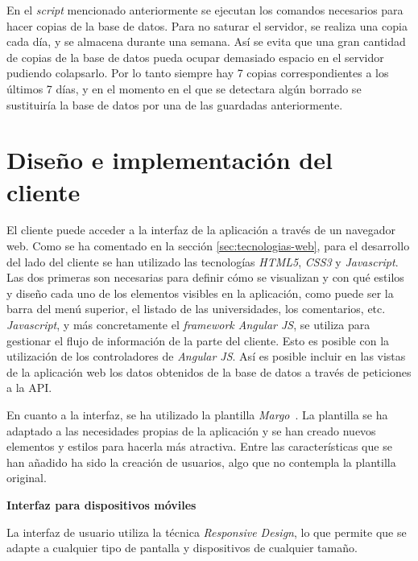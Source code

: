 \documentclass[a4paper, 12pt]{book}
\begin{document}
En el  \textit{script} mencionado anteriormente se ejecutan los comandos necesarios para hacer copias de la base de datos. Para no saturar el servidor, se realiza una copia cada día, y se almacena durante una semana. Así se evita que una gran cantidad de copias de la base de datos pueda ocupar demasiado espacio en el servidor pudiendo colapsarlo. Por lo tanto siempre hay 7 copias correspondientes a los últimos 7 días, y en el momento en el que se detectara algún borrado se sustituiría la base de datos por una de las guardadas anteriormente.



\section{Diseño e implementación del cliente} 
\label{sec:diseno-cliente}

El cliente puede acceder a la interfaz de la aplicación a través de un navegador web. Como se ha comentado en la sección \ref{sec:tecnologias-web}, para el desarrollo del lado del cliente se han utilizado las tecnologías  \textit{HTML5},  \textit{CSS3} y  \textit{Javascript}. Las dos primeras son necesarias para definir cómo se visualizan y con qué estilos y diseño cada uno de los elementos visibles en la aplicación, como puede ser la barra del menú superior, el listado de las universidades, los comentarios, etc.  \textit{Javascript}, y más concretamente el  \textit{framework Angular JS}, se utiliza para gestionar el flujo de información de la parte del cliente. Esto es posible con la utilización de los controladores de  \textit{Angular JS}. Así es posible incluir en las vistas de la aplicación web los datos obtenidos de la base de datos a través de peticiones a la API.
\newline

En cuanto a la interfaz, se ha utilizado la plantilla \textit{Margo}~\cite{pagina-margo}. La plantilla se ha adaptado a las necesidades propias de la aplicación y se han  creado nuevos elementos y estilos para hacerla más atractiva. Entre las características que se han añadido ha sido la creación de usuarios, algo que no contempla la plantilla original.

{\large  \textbf{Interfaz para dispositivos móviles}\par}

La interfaz de usuario utiliza la técnica \textit{Responsive Design}, lo que permite que se adapte a cualquier tipo de pantalla y dispositivos de cualquier tamaño.
\end{document}

